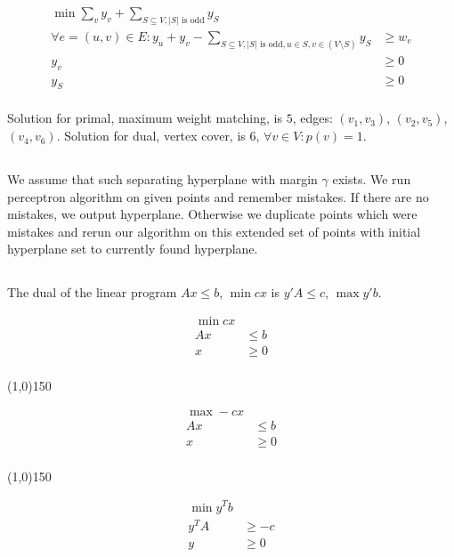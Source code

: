 \documentclass[a4paper,11pt,oneside,onecolumn]{article}
\def\zline{
    \vspace{-3.9em}
    \begin{center}\centering\line(1,0){150}\end{center}
    \vspace{-2.9em}
}
\begin{document}
\begin{align*}
\min \sum_v y_v + \sum_{S \subseteq V, |S| \textrm{ is odd}} y_S & \\
\forall e = (u,v) \in E: y_u + y_v - \sum_{S \subseteq V, |S| \textrm{ is odd}, u \in S, v \in (V \setminus S)} y_S & \ge w_e \\
y_v & \ge 0 \\
y_S & \ge 0 \\
\end{align*}

Solution for primal, maximum weight matching, is $5$, edges: $(v_1, v_3)$, $(v_2, v_5)$, $(v_4, v_6)$. Solution for dual, vertex
cover, is $6$, $\forall v \in V: p(v) = 1$.

\subsection{}

We assume that such separating hyperplane with margin $\gamma$ exists. We run perceptron algorithm on given points and remember mistakes. If there are no
mistakes, we output hyperplane. Otherwise we duplicate points which were mistakes and rerun our algorithm on this extended set of
points with initial hyperplane set to currently found hyperplane.

\subsection{}

The dual of the linear program $Ax \le b$, $\min cx$ is $y'A \le c$, $\max y'b$.

\begin{align*}
\min cx & \\
Ax & \le b \\
x & \ge 0 \\
\end{align*}

\zline

\begin{align*}
\max -cx & \\
Ax & \le b \\
x & \ge 0 \\
\end{align*}

\zline

\begin{align*}
\min y^Tb & \\
y^TA & \ge -c \\
y & \ge 0 \\
\end{align*}
\end{document}
